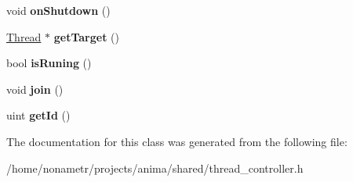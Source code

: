 \begin{DoxyCompactItemize}
\item 
\hypertarget{classThreadController_a3825c8c75845c86c48ea1f4caabfc3f5}{
void {\bfseries onShutdown} ()}
\label{classThreadController_a3825c8c75845c86c48ea1f4caabfc3f5}

\item 
\hypertarget{classThreadController_a945a302b689835971081b21a57c16023}{
\hyperlink{classThread}{Thread} $\ast$ {\bfseries getTarget} ()}
\label{classThreadController_a945a302b689835971081b21a57c16023}

\item 
\hypertarget{classThreadController_a6cc4c389d03bb41a87f495dc01291c03}{
bool {\bfseries isRuning} ()}
\label{classThreadController_a6cc4c389d03bb41a87f495dc01291c03}

\item 
\hypertarget{classThreadController_a2dd979e4429cff919c2fd12fa02c1394}{
void {\bfseries join} ()}
\label{classThreadController_a2dd979e4429cff919c2fd12fa02c1394}

\item 
\hypertarget{classThreadController_a9b29bed97f0135ffef8bbffe11221f38}{
uint {\bfseries getId} ()}
\label{classThreadController_a9b29bed97f0135ffef8bbffe11221f38}

\end{DoxyCompactItemize}


The documentation for this class was generated from the following file:\begin{DoxyCompactItemize}
\item 
/home/nonametr/projects/anima/shared/thread\_\-controller.h\end{DoxyCompactItemize}

